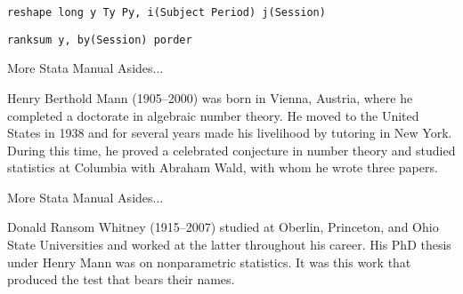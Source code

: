 \documentclass{beamer}
\begin{document}
\begin{frame}
    \begin{card}[STATA]
        \texttt{reshape long y Ty Py, i(Subject Period) j(Session)}
    
        \texttt{ranksum y, by(Session) porder}
    \end{card}
\end{frame}


\begin{frame}{More Stata Manual Asides...}
\begin{card}
Henry Berthold Mann (1905--2000) was born in Vienna, Austria, where he completed a doctorate
in algebraic number theory. He moved to the United States in 1938 and for several years made
his livelihood by tutoring in New York. During this time, he proved a celebrated conjecture in number theory and studied statistics at Columbia with Abraham Wald, with whom he wrote three papers.
\end{card}
\end{frame}

\begin{frame}{More Stata Manual Asides...}
    \begin{card}
    Donald Ransom Whitney (1915--2007) studied at Oberlin, Princeton, and Ohio State Universities and worked at the latter throughout his career. His PhD thesis under Henry Mann was on nonparametric statistics. It was this work that produced the test that bears their names.
    \end{card}
\end{frame}
\end{document}
